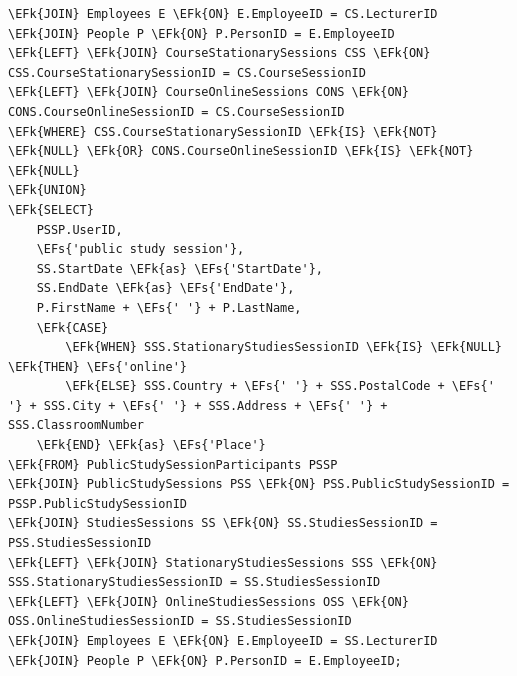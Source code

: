 \documentclass[11pt]{article}
\newcommand{\EFs}[1]{\textcolor{EFs}{#1}} %
\newcommand{\EFk}[1]{\textcolor{EFk}{\textbf{#1}}} %
\begin{document}
\begin{Code}
\begin{Verbatim}
\EFk{JOIN} Employees E \EFk{ON} E.EmployeeID = CS.LecturerID
\EFk{JOIN} People P \EFk{ON} P.PersonID = E.EmployeeID
\EFk{LEFT} \EFk{JOIN} CourseStationarySessions CSS \EFk{ON} CSS.CourseStationarySessionID = CS.CourseSessionID
\EFk{LEFT} \EFk{JOIN} CourseOnlineSessions CONS \EFk{ON} CONS.CourseOnlineSessionID = CS.CourseSessionID
\EFk{WHERE} CSS.CourseStationarySessionID \EFk{IS} \EFk{NOT} \EFk{NULL} \EFk{OR} CONS.CourseOnlineSessionID \EFk{IS} \EFk{NOT} \EFk{NULL}
\EFk{UNION}
\EFk{SELECT}
    PSSP.UserID,
    \EFs{'public study session'}, 
    SS.StartDate \EFk{as} \EFs{'StartDate'},
    SS.EndDate \EFk{as} \EFs{'EndDate'},
    P.FirstName + \EFs{' '} + P.LastName, 
    \EFk{CASE} 
        \EFk{WHEN} SSS.StationaryStudiesSessionID \EFk{IS} \EFk{NULL} \EFk{THEN} \EFs{'online'}
        \EFk{ELSE} SSS.Country + \EFs{' '} + SSS.PostalCode + \EFs{' '} + SSS.City + \EFs{' '} + SSS.Address + \EFs{' '} + SSS.ClassroomNumber
    \EFk{END} \EFk{as} \EFs{'Place'}
\EFk{FROM} PublicStudySessionParticipants PSSP
\EFk{JOIN} PublicStudySessions PSS \EFk{ON} PSS.PublicStudySessionID = PSSP.PublicStudySessionID
\EFk{JOIN} StudiesSessions SS \EFk{ON} SS.StudiesSessionID = PSS.StudiesSessionID
\EFk{LEFT} \EFk{JOIN} StationaryStudiesSessions SSS \EFk{ON} SSS.StationaryStudiesSessionID = SS.StudiesSessionID
\EFk{LEFT} \EFk{JOIN} OnlineStudiesSessions OSS \EFk{ON} OSS.OnlineStudiesSessionID = SS.StudiesSessionID
\EFk{JOIN} Employees E \EFk{ON} E.EmployeeID = SS.LecturerID
\EFk{JOIN} People P \EFk{ON} P.PersonID = E.EmployeeID;
\end{Verbatim}
\end{Code}
\end{document}
